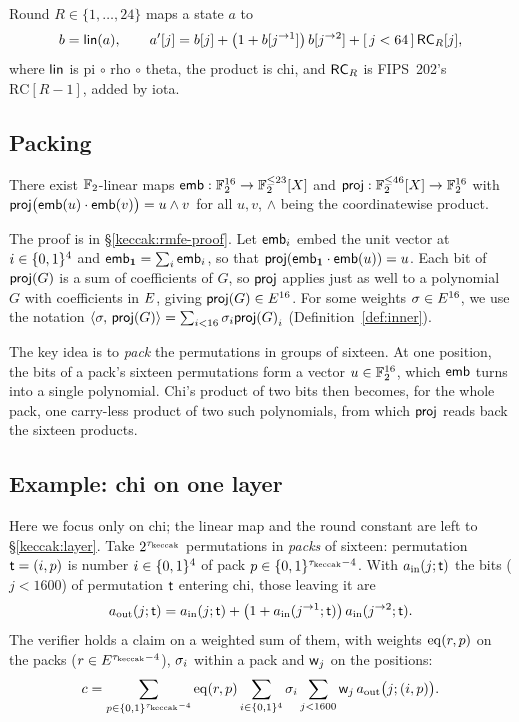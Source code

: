 Round $R\in\{1,\dots,24\}$ maps a state $a$ to
\begin{equation}\label{keccak:eq:round}
b=\mathsf{lin}(a),\qquad a'[j]=b[j]+\bigl(1+b[j^{\rightarrow 1}]\bigr)\,b[j^{\rightarrow 2}]+[\,j<64\,]\,\mathsf{RC}_R[j],
\end{equation}
where $\mathsf{lin}$ is pi $\circ$ rho $\circ$ theta, the product is chi, and $\mathsf{RC}_R$ is FIPS~202's $\mathrm{RC}[R-1]$, added by iota.

\subsection{Packing}\label{keccak:rmfe}

\begin{lemma}[Embedding]\label{lem:rmfe}
There exist $\mathbb{F}_2$-linear maps $\mathsf{emb}:\mathbb{F}_2^{16}\to\mathbb{F}_2^{\le23}[X]$ and $\mathsf{proj}:\mathbb{F}_2^{\le46}[X]\to\mathbb{F}_2^{16}$ with $\mathsf{proj}\bigl(\mathsf{emb}(u)\cdot\mathsf{emb}(v)\bigr)=u\wedge v$ for all $u,v$, $\wedge$ being the coordinatewise product.
\end{lemma}

The proof is in \S\ref{keccak:rmfe-proof}. Let $\mathsf{emb}_i$ embed the unit vector at $i\in\{0,1\}^{4}$ and $\mathsf{emb}_{\mathbf{1}}=\sum_i\mathsf{emb}_i$, so that $\mathsf{proj}(\mathsf{emb}_{\mathbf{1}}\cdot\mathsf{emb}(u))=u$. Each bit of $\mathsf{proj}(G)$ is a sum of coefficients of $G$, so $\mathsf{proj}$ applies just as well to a polynomial $G$ with coefficients in $E$, giving $\mathsf{proj}(G)\in E^{16}$. For some weights $\sigma\in E^{16}$, we use the notation $\langle \sigma,\, \mathsf{proj}(G) \rangle = \sum_{i < 16} {\sigma}_i{\mathsf{proj}(G)}_i$ (Definition~\ref{def:inner}).

The key idea is to \emph{pack} the permutations in groups of sixteen. At one position, the bits of a pack's sixteen permutations form a vector $u\in\mathbb{F}_2^{16}$, which $\mathsf{emb}$ turns into a single polynomial. Chi's product of two bits then becomes, for the whole pack, one carry-less product of two such polynomials, from which $\mathsf{proj}$ reads back the sixteen products.

\subsection{Example: chi on one layer}\label{keccak:idea}

Here we focus only on chi; the linear map and the round constant are left to \S\ref{keccak:layer}. Take $2^{\tau_{\mathrm{keccak}}}$ permutations in \emph{packs} of sixteen: permutation $\mathsf{t}=(i,p)$ is number $i\in\{0,1\}^{4}$ of pack $p\in\{0,1\}^{\tau_{\mathrm{keccak}}-4}$. With $a_{\mathrm{in}}(j;\mathsf{t})$ the bits ($j < 1600$) of permutation $\mathsf{t}$ entering chi, those leaving it are
\[
a_{\mathrm{out}}(j;\mathsf{t})=a_{\mathrm{in}}(j;\mathsf{t})+\bigl(1+a_{\mathrm{in}}(j^{\rightarrow 1};\mathsf{t})\bigr)\,a_{\mathrm{in}}(j^{\rightarrow 2};\mathsf{t}).
\]
The verifier holds a claim on a weighted sum of them, with weights $\operatorname{eq}(r,p)$ on the packs ($r\in E^{\tau_{\mathrm{keccak}}-4}$), $\sigma_i$ within a pack and $\mathsf{w}_j$ on the positions:
\[
c=\sum_{p\in\{0,1\}^{\tau_{\mathrm{keccak}}-4}}\operatorname{eq}(r,p)\sum_{i\in\{0,1\}^{4}}\sigma_i\sum_{j<1600}\mathsf{w}_j\,a_{\mathrm{out}}\bigl(j;(i,p)\bigr).
\]

